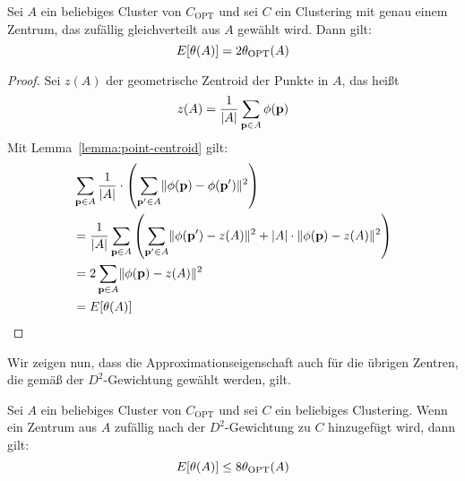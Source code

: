 \begin{lemma}
\label{lemma:kkmpp-first-center-approx}
	Sei $A$ ein beliebiges Cluster von $C_\textrm{OPT}$ und sei $C$ ein Clustering mit genau einem Zentrum, das zufällig
	gleichverteilt aus $A$ gewählt wird. Dann gilt:
	\[ E[\theta(A)] = 2 \theta_{\textrm{OPT}}(A) \]
\end{lemma}
\begin{proof}
	Sei $z(A)$ der geometrische Zentroid der Punkte in $A$, das heißt
	\[ z(A) = \frac{1}{\left|A\right|} \sum_{\mathbf{p} \in A} \phi(\mathbf{p}) \]
	Mit Lemma~\ref{lemma:point-centroid} gilt:
	\begin{align*}
		& \sum_{\mathbf{p} \in A} \frac{1}{\left|A\right|} \cdot \left( \sum_{\mathbf{p}' \in A} \lVert {\phi(\ensuremath{\mathbf{p}})} - {\phi(\mathbf{p}')} \rVert^2 \right) \\
		&= \frac{1}{\left|A\right|} \sum_{\mathbf{p} \in A} \left( \sum_{\mathbf{p}' \in A} \lVert {\phi(\ensuremath{\mathbf{p}}')} - {z(A)} \rVert^2 
			+ \left|A\right| \cdot \lVert {\phi(\ensuremath{\mathbf{p}})} - {z(A)} \rVert^2 \right) \\
		&= 2 \sum_{\mathbf{p} \in A} \lVert {\phi(\ensuremath{\mathbf{p}})} - {z(A)} \rVert^2 \\
		&= E[\theta(A)]
	\end{align*}
\end{proof}
Wir zeigen nun, dass die Approximationseigenschaft auch für die übrigen Zentren, die gemäß der $D^2$-Gewichtung gewählt werden,
gilt.
\begin{lemma}
\label{lemma:kkmpp-remaining-center-approx}
	Sei $A$ ein beliebiges Cluster von $C_\textrm{OPT}$ und sei $C$ ein beliebiges Clustering. Wenn ein Zentrum aus $A$
	zufällig nach der $D^2$-Gewichtung zu $C$ hinzugefügt wird, dann gilt:
	\[ E[\theta(A)] \leq 8 \theta_{\textrm{OPT}}(A) \]
\end{lemma}
